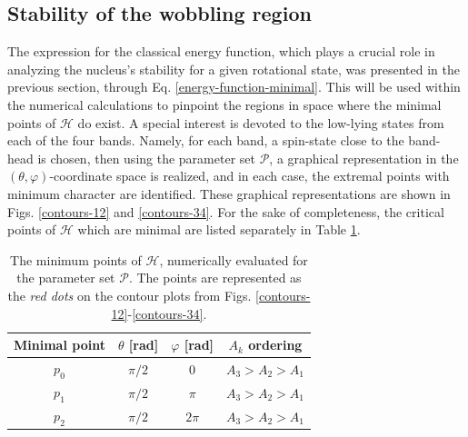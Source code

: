 \documentclass[myclassdoc,debug]{rjparticle}
\begin{document}
\subsection{Stability of the wobbling region}\label{wobbling-stability}

The expression for the classical energy function, which plays a crucial role in analyzing the nucleus's stability for a given rotational state, was presented in the previous section, through Eq. \ref{energy-function-minimal}. This will be used within the numerical calculations to pinpoint the regions in space where the minimal points of $\mathcal{H}$ do exist. A special interest is devoted to the low-lying states from each of the four bands. Namely, for each band, a spin-state close to the band-head is chosen, then using the parameter set $\mathcal{P}$, a graphical representation in the $(\theta,\varphi)$-coordinate space is realized, and in each case, the extremal points with minimum character are identified. These graphical representations are shown in Figs. \ref{contours-12} and \ref{contours-34}. For the sake of completeness, the critical points of $\mathcal{H}$ which are minimal are listed separately in Table \ref{critical_points_h}.

\begin{table}[ht]
\caption{The minimum points of $\mathcal{H}$, numerically evaluated for the parameter set $\mathcal{P}$. The points are represented as the \emph{red dots} on the contour plots from Figs. \ref{contours-12}-\ref{contours-34}.}
    \centering
\begin{tabular}{cccc}
\hline
Minimal point & $\theta$ [rad] & $\varphi$ [rad] & $A_k$ ordering \\
\hline
\hline
$p_0$         & $\pi/2$       &    $0$       &      $A_3>A_2>A_1$          \\
$p_1$         & $\pi/2$      &   $\pi$    &      $A_3>A_2>A_1$          \\
$p_2$         & $\pi/2$     &   $2\pi$        &      $A_3>A_2>A_1$ \\
\hline
\end{tabular}
    \label{critical_points_h}
\end{table}
\end{document}
